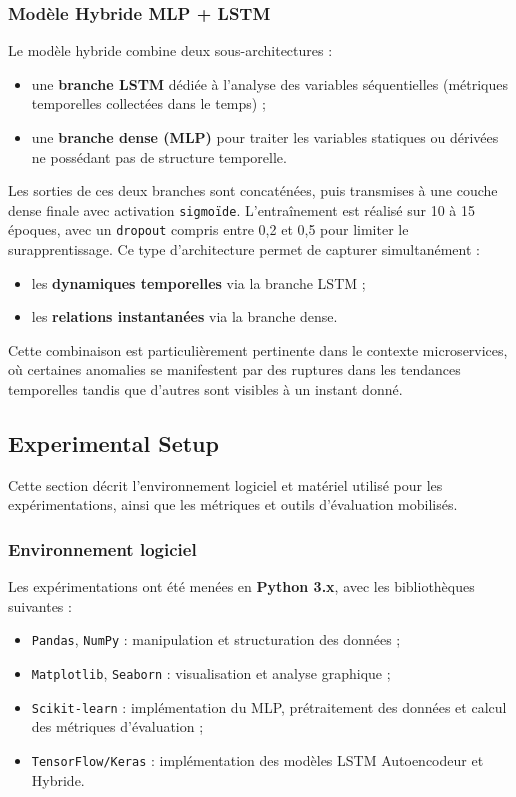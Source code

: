 \documentclass[conference]{IEEEtran}
\begin{document}
\subsubsection{Modèle Hybride MLP + LSTM}
Le modèle hybride combine deux sous-architectures :
\begin{itemize}
    \item une \textbf{branche LSTM} dédiée à l’analyse des variables séquentielles (métriques temporelles collectées dans le temps) ;
    \item une \textbf{branche dense (MLP)} pour traiter les variables statiques ou dérivées ne possédant pas de structure temporelle.
\end{itemize}
Les sorties de ces deux branches sont concaténées, puis transmises à une couche dense finale avec activation \texttt{sigmoïde}.
L’entraînement est réalisé sur 10 à 15 époques, avec un \texttt{dropout} compris entre 0,2 et 0,5 pour limiter le surapprentissage.
Ce type d’architecture permet de capturer simultanément :
\begin{itemize}
    \item les \textbf{dynamiques temporelles} via la branche LSTM ;
    \item les \textbf{relations instantanées} via la branche dense.
\end{itemize}
Cette combinaison est particulièrement pertinente dans le contexte microservices, où certaines anomalies se manifestent par des ruptures dans les tendances temporelles tandis que d’autres sont visibles à un instant donné.

\subsection{Experimental Setup}

Cette section décrit l’environnement logiciel et matériel utilisé pour les expérimentations, ainsi que les métriques et outils d’évaluation mobilisés.

\subsubsection{Environnement logiciel}
Les expérimentations ont été menées en \textbf{Python 3.x}, avec les bibliothèques suivantes :
\begin{itemize}
    \item \texttt{Pandas}, \texttt{NumPy} : manipulation et structuration des données ;
    \item \texttt{Matplotlib}, \texttt{Seaborn} : visualisation et analyse graphique ;
    \item \texttt{Scikit-learn} : implémentation du MLP, prétraitement des données et calcul des métriques d’évaluation ;
    \item \texttt{TensorFlow/Keras} : implémentation des modèles LSTM Autoencodeur et Hybride.
\end{itemize}
\end{document}
